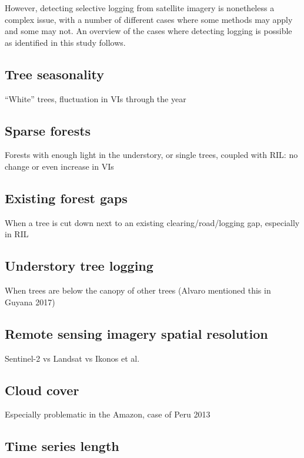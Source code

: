 \documentclass[a4paper,12pt]{scrbook}
\begin{document}
However, detecting selective logging from satellite imagery is nonetheless a complex issue, with a number of different cases where some methods may apply and some may not. An overview of the cases where detecting logging is possible as identified in this study follows.

\subsection{Tree seasonality}

``White'' trees, fluctuation in VIs through the year

\subsection{Sparse forests}

Forests with enough light in the understory, or single trees, coupled with \ac{RIL}: no change or even increase in VIs

\subsection{Existing forest gaps}

When a tree is cut down next to an existing clearing/road/logging gap, especially in \ac{RIL}

\subsection{Understory tree logging}

When trees are below the canopy of other trees (Alvaro mentioned this in Guyana 2017)

\subsection{Remote sensing imagery spatial resolution}

Sentinel-2 vs Landsat vs Ikonos et al.

\subsection{Cloud cover}

Especially problematic in the Amazon, case of Peru 2013

\subsection{Time series length}
\end{document}
